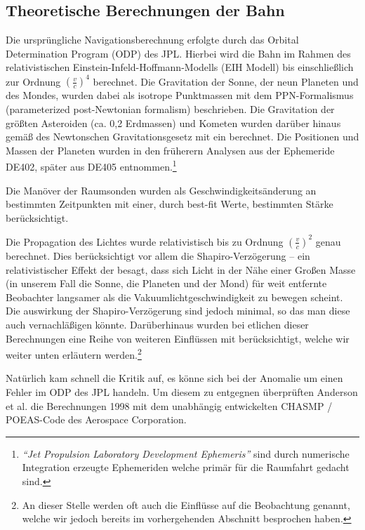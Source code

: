 
\subsection{Theoretische Berechnungen der Bahn}
Die ursprüngliche Navigationsberechnung erfolgte durch das Orbital Determination Program (ODP) des JPL.
Hierbei wird die Bahn im Rahmen des relativistischen Einstein-Infeld-Hoffmann-Modells (EIH Modell)
bis einschließlich zur Ordnung $(\frac{v}{c})^4$ berechnet.
Die Gravitation der Sonne, der neun Planeten und des Mondes, wurden dabei als isotrope Punktmassen mit dem
PPN-Formalismus (parameterized post-Newtonian formalism) beschrieben\cite{Anderson2002}. Die Gravitation der größten
Asteroiden (ca. 0,2 Erdmassen) und Kometen wurden darüber hinaus gemäß des Newtonschen Gravitationsgesetz mit
ein berechnet. Die Positionen und Massen der Planeten wurden in den früherern Analysen aus der Ephemeride
DE402, später aus DE405 entnommen.\footnote{\textit{``Jet Propulsion Laboratory Development Ephemeris''} sind durch
numerische Integration erzeugte Ephemeriden welche primär für die Raumfahrt gedacht sind.}\cite{Anderson2002}

Die Manöver der Raumsonden wurden als Geschwindigkeitsänderung an bestimmten Zeitpunkten mit einer, durch best-fit Werte,
bestimmten Stärke berücksichtigt.\cite{Levy2008}	%

Die Propagation des Lichtes wurde relativistisch bis zu Ordnung $(\frac{v}{c})^2$ genau berechnet. Dies berücksichtigt
vor allem die Shapiro-Verzögerung – ein relativistischer Effekt der besagt, dass sich Licht in der Nähe einer Großen
Masse (in unserem Fall die Sonne, die Planeten und der Mond) für weit entfernte Beobachter langsamer als die
Vakuumlichtgeschwindigkeit zu bewegen scheint. %
Die auswirkung der Shapiro-Verzögerung sind jedoch minimal,\cite{Levy2008} so das man diese auch vernachläßigen könnte.
Darüberhinaus wurden bei etlichen dieser Berechnungen eine Reihe von weiteren Einflüssen mit berücksichtigt, welche wir
weiter unten %
erläutern werden.\footnote{An dieser Stelle werden oft auch die Einflüsse auf die Beobachtung genannt, welche wir jedoch
bereits im vorhergehenden Abschnitt besprochen haben.}


Natürlich kam schnell die Kritik auf, es könne sich bei der Anomalie um einen Fehler im ODP des JPL handeln.
Um diesem zu entgegnen überprüften Anderson et al. die Berechnungen 1998 mit dem unabhängig entwickelten CHASMP / POEAS-Code des Aerospace Corporation.

